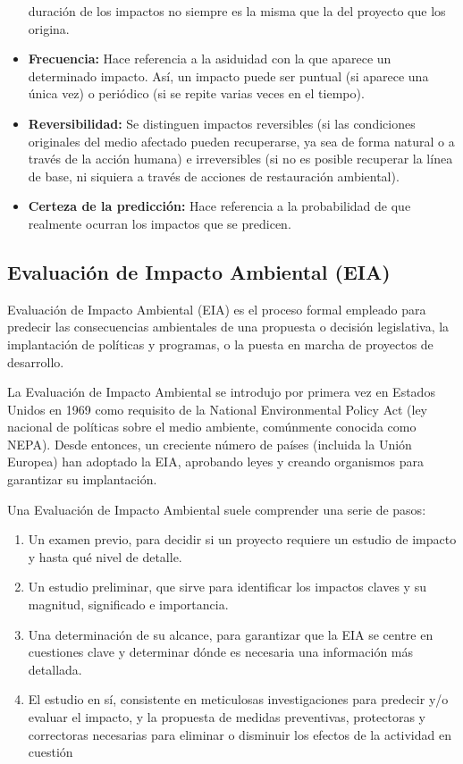 \begin{itemize}
	      duración de los impactos no siempre es la misma que la del proyecto que los origina.
	\item \textbf{Frecuencia:} Hace referencia a la asiduidad con la que aparece un determinado
	      impacto. Así, un impacto puede ser puntual (si aparece una única vez) o periódico (si
	      se repite varias veces en el tiempo).
	\item \textbf{Reversibilidad:} Se distinguen impactos reversibles (si las condiciones originales del
	      medio afectado pueden recuperarse, ya sea de forma natural o a través de la acción
	      humana) e irreversibles (si no es posible recuperar la línea de base, ni siquiera a
	      través de acciones de restauración ambiental).
	\item \textbf{Certeza de la predicción:} Hace referencia a la probabilidad de que realmente
	      ocurran los impactos que se predicen.
\end{itemize}

\subsection{Evaluación de Impacto Ambiental (EIA)}

Evaluación de Impacto Ambiental (EIA) es el proceso formal empleado para
predecir las consecuencias ambientales de una propuesta o decisión legislativa, la
implantación de políticas y programas, o la puesta en marcha de proyectos de
desarrollo.

La Evaluación de Impacto Ambiental se introdujo por primera vez en Estados
Unidos en 1969 como requisito de la National Environmental Policy Act (ley nacional de políticas sobre el medio ambiente, comúnmente conocida como NEPA). Desde
entonces, un creciente número de países (incluida la Unión Europea) han adoptado la
EIA, aprobando leyes y creando organismos para garantizar su implantación.

Una Evaluación de Impacto Ambiental suele comprender una serie de pasos:

\begin{enumerate}
	\item Un examen previo, para decidir si un proyecto requiere un estudio de impacto
	      y hasta qué nivel de detalle.
	\item Un estudio preliminar, que sirve para identificar los impactos claves y su
	      magnitud, significado e importancia.
	\item Una determinación de su alcance, para garantizar que la EIA se centre en
	      cuestiones clave y determinar dónde es necesaria una información más detallada.
	\item El estudio en sí, consistente en meticulosas investigaciones para predecir y/o
	      evaluar el impacto, y la propuesta de medidas preventivas, protectoras y correctoras
	      necesarias para eliminar o disminuir los efectos de la actividad en cuestión
\end{enumerate}


